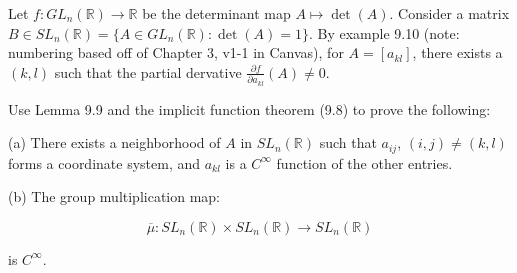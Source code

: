 \documentclass[10pt]{article}
\theoremstyle{nonumberplain}%
\newenvironment{problem}[2][]{\begin{trivlist}
\item[\hskip \labelsep {\bfseries #1}\hskip \labelsep {\bfseries #2.}]}{\end{trivlist}}
\begin{document}
\begin{problem}{Question 4}

Let $f: GL_n(\mathbb{R}) \to \mathbb{R}$ be the determinant map $A \mapsto \det(A)$. Consider a matrix $B \in SL_n(\mathbb{R}) = \{ A \in GL_n(\mathbb{R}) : \det(A) = 1 \}$. By example 9.10 (note: numbering based off of Chapter 3, v1-1 in Canvas), for $A = [ a_{kl}]$, there exists a $(k, l)$ such that the partial dervative $\frac{\partial f}{ \partial a_{kl}}(A) \not = 0$. 

Use Lemma 9.9 and the implicit function theorem (9.8) to prove the following:

(a) There exists a neighborhood of $A$ in $SL_n(\mathbb{R})$ such that $a_{ij}$, $(i,j) \not = (k,l)$ forms a coordinate system, and $a_{kl}$ is a $C^\infty$ function of the other entries.

(b) The group multiplication map:

$$\overline{\mu}: SL_n(\mathbb{R}) \times SL_n(\mathbb{R}) \to SL_n(\mathbb{R})$$

is $C^\infty$.


\end{problem}
\end{document}
